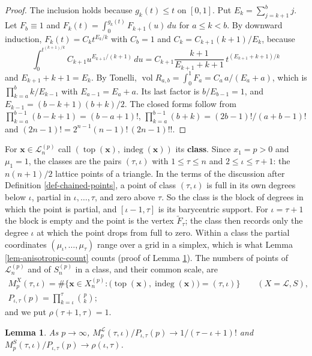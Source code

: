 \documentclass[11pt, a4paper, abstract=yes]{scrartcl}
\theoremstyle{definition}
\theoremstyle{remark}
\theoremstyle{plain}
\newtheorem{lemma}[definition]{Lemma}
\newcommand{\vek}[1]{\boldsymbol{#1}}
\theoremstyle{remark}
\theoremstyle{plain}
\newcommand{\indeg}{\operatorname{indeg}}
\newcommand{\tp}{\operatorname{top}}
\newcommand{\vol}{\operatorname{vol}}
\newcommand{\leannone}{\tikz[baseline=-0.6ex]\draw[leannone,line width=0.6pt] (0,0) circle (0.55ex);}
\newcommand{\leanmark}[1]{\leavevmode{\reversemarginpar\marginnote{\raggedleft#1}}}
\begin{document}
\begin{proof}
The inclusion holds because \(g_k(t)\le t\) on \([0,1]\). Put \(E_k=\sum_{j=k+1}^bj\). Let
\(F_b\equiv1\) and \(F_k(t)=\int_0^{g_k(t)}F_{k+1}(u)\,du\) for \(a\le k<b\). By downward induction,
\(F_k(t)=C_kt^{E_k/k}\) with \(C_b=1\) and \(C_k=C_{k+1}(k+1)/E_k\), because
\[
  \int_0^{t^{(k+1)/k}}C_{k+1}u^{E_{k+1}/(k+1)}\,du=C_{k+1}\frac{k+1}{E_{k+1}+k+1}\,t^{(E_{k+1}+k+1)/k}
\]
and \(E_{k+1}+k+1=E_k\). By Tonelli, \(\vol R_{a,b}=\int_0^1F_a=C_a\,a/(E_a+a)\), which is
\(\prod_{k=a}^bk/E_{k-1}\) with \(E_{a-1}=E_a+a\). Its last factor is \(b/E_{b-1}=1\), and
\(E_{k-1}=(b-k+1)(b+k)/2\). The closed forms follow from \(\prod_{k=a}^{b-1}(b-k+1)=(b-a+1)!\),
\(\prod_{k=a}^{b-1}(b+k)=(2b-1)!/(a+b-1)!\) and \((2n-1)!=2^{n-1}(n-1)!\,(2n-1)!!\).
\end{proof}

For \(\vek x\in\mathcal L_n^{(p)}\) call \((\tp(\vek x),\indeg(\vek x))\) its \textbf{class}. Since
\(x_1=p>0\) and \(\mu_1=1\), the classes are the pairs \((\tau,\iota)\) with \(1\le\tau\le n\) and
\(2\le\iota\le\tau+1\): the \(n(n+1)/2\) lattice points of a triangle. In the terms of the
discussion after Definition \ref{def-chained-points}, a point of class \((\tau,\iota)\) is full in its
own degrees below \(\iota\), partial in \(\iota,\dots,\tau\), and zero above \(\tau\). So the class is
the block of degrees in which the point is partial, and \([\iota-1,\tau]\) is its barycentric
support. For \(\iota=\tau+1\) the block is empty and the point is the vertex \(\tilde F_\tau\); the
class then records only the degree \(\iota\) at which the point drops from full to zero. Within a
class the partial coordinates \((\mu_\iota,\dots,\mu_\tau)\) range over a grid in a simplex, which is
what Lemma \ref{lem-anisotropic-count} counts (proof of Lemma \ref{lem-kup-classes}). The numbers of points of \(\mathcal L_n^{(p)}\) and of \(S_n^{(p)}\) in a
class, and their common scale, are
\begin{equation}\label{eq:classcounts}
\begin{gathered}
  M^X_p(\tau,\iota)=\#\bigl\lbrace\vek x\in X_n^{(p)}:\bigl(\tp(\vek x),\indeg(\vek x)\bigr)=(\tau,\iota)\bigr\rbrace
  \qquad(X=\mathcal L,S),\\
  P_{\iota,\tau}(p)=\prod_{k=\iota}^\tau\binom pk ;
\end{gathered}
\end{equation}
and we put \(\rho(\tau+1,\tau)=1\).

\begin{lemma}
\leanmark{\leannone}As \(p\to\infty\), \(M^{\mathcal L}_p(\tau,\iota)/P_{\iota,\tau}(p)\to1/(\tau-\iota+1)!\) and
\(M^S_p(\tau,\iota)/P_{\iota,\tau}(p)\to\rho(\iota,\tau)\).
\label{lem-kup-classes}
\end{lemma}
\end{document}
